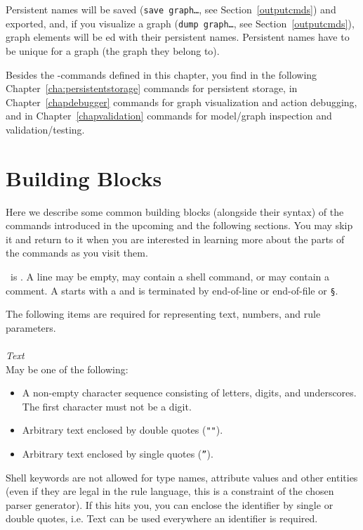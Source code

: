 \begin{note}
Persistent names will be saved (\texttt{save graph\dots}, see Section~\ref{outputcmds}) and exported,
and, if you visualize a graph (\texttt{dump graph\dots}, see Section~\ref{outputcmds}),
graph elements will be ed with their persistent names.
Persistent names have to be unique for a graph (the graph they belong to).
\end{note}

Besides the \GrShell{}-commands defined in this chapter, you find in the following Chapter~\ref{cha:persistentstorage} commands for persistent storage, in Chapter~\ref{chapdebugger} commands for graph visualization and action debugging, and in Chapter~\ref{chapvalidation} commands for model/graph inspection and validation/testing.


\section{Building Blocks}\label{shellbuildingblocks}

Here we describe some common building blocks (alongside their syntax) of the commands introduced in the upcoming and the following sections.
You may skip it and return to it when you are interested in learning more about the parts of the commands as you visit them.

\GrShell\ is .
A line may be empty, may contain a shell command, or may contain a comment.
A  starts with a \indexed{\texttt{\#}} and is terminated by end-of-line
 or end-of-file or \texttt{\S}.

The following items are required for representing text, numbers, and rule parameters.\\
\\
\emph{Text}\\
May be one of the following:
\begin{itemize}
  \item A non-empty character sequence consisting of letters, digits, and underscores. The first character must not be a digit.
  \item Arbitrary text enclosed by double quotes (\texttt{""}).
  \item Arbitrary text enclosed by single quotes (\texttt{''}).
\end{itemize}
Shell keywords are not allowed for type names, attribute values and other entities (even if they are legal in the rule language, this is a constraint of the chosen parser generator).
If this hits you, you can enclose the identifier by single or double quotes, i.e. Text can be used everywhere an identifier is required.

